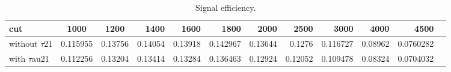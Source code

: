 \documentclass{article}
\begin{document}
  
  
 \begin{sidewaystable}[h]

  \begin{center}
    \begin{tabular}{l c c rrrrrrrrr}
\hline
cut  & 1000 & 1200 & 1400 & 1600 & 1800 & 2000 & 2500 & 3000 & 4000 & 4500\\
\hline
without $\tau$21  & 0.115955 & 0.13756 & 0.14054 & 0.13918 & 0.142967 & 0.13644 & 0.1276 & 0.116727 & 0.08962 & 0.0760282\\
with $\tau$au21  & 0.112256 & 0.13204 & 0.13414 & 0.13284 & 0.136463 & 0.12924 & 0.12052 & 0.109478 & 0.08324 & 0.0704032\\
\hline
\end{tabular}
  \end{center}
  \caption{Signal efficiency.}

\end{sidewaystable}
\end{document}
